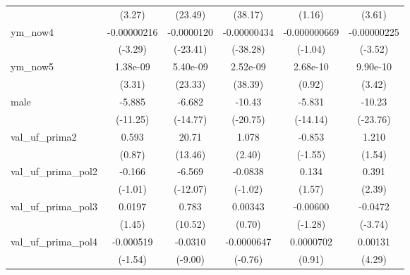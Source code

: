 {\begin{tabular}{l*{5}{c}}
                    &      (3.27)         &     (23.49)         &     (38.17)         &      (1.16)         &      (3.61)         \\
ym\_now4             & -0.00000216\sym{**} &  -0.0000120\sym{***}& -0.00000434\sym{***}&-0.000000669         & -0.00000225\sym{***}\\
                    &     (-3.29)         &    (-23.41)         &    (-38.28)         &     (-1.04)         &     (-3.52)         \\
ym\_now5             &    1.38e-09\sym{***}&    5.40e-09\sym{***}&    2.52e-09\sym{***}&    2.68e-10         &    9.90e-10\sym{***}\\
                    &      (3.31)         &     (23.33)         &     (38.39)         &      (0.92)         &      (3.42)         \\
male                &      -5.885\sym{***}&      -6.682\sym{***}&      -10.43\sym{***}&      -5.831\sym{***}&      -10.23\sym{***}\\
                    &    (-11.25)         &    (-14.77)         &    (-20.75)         &    (-14.14)         &    (-23.76)         \\
val\_uf\_prima2       &       0.593         &       20.71\sym{***}&       1.078\sym{*}  &      -0.853         &       1.210         \\
                    &      (0.87)         &     (13.46)         &      (2.40)         &     (-1.55)         &      (1.54)         \\
val\_uf\_prima\_pol2   &      -0.166         &      -6.569\sym{***}&     -0.0838         &       0.134         &       0.391\sym{*}  \\
                    &     (-1.01)         &    (-12.07)         &     (-1.02)         &      (1.57)         &      (2.39)         \\
val\_uf\_prima\_pol3   &      0.0197         &       0.783\sym{***}&     0.00343         &    -0.00600         &     -0.0472\sym{***}\\
                    &      (1.45)         &     (10.52)         &      (0.70)         &     (-1.28)         &     (-3.74)         \\
val\_uf\_prima\_pol4   &   -0.000519         &     -0.0310\sym{***}&  -0.0000647         &   0.0000702         &     0.00131\sym{***}\\
                    &     (-1.54)         &     (-9.00)         &     (-0.76)         &      (0.91)         &      (4.29)         \\

\end{tabular}}
